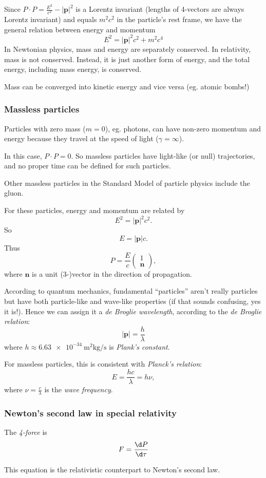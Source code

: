 \documentclass[a4paper]{article}
\begin{document}
Since $P\cdot P = \frac{E^2}{c^2} - |\mathbf{p}|^2$ is a Lorentz invariant (lengths of 4-vectors are always Lorentz invariant) and equals $m^2 c^2$ in the particle's rest frame, we have the general relation between energy and momentum
\[
  E^2 = |\mathbf{p}|^2 c^2 + m^2c^4
\]
In Newtonian physics, mass and energy are separately conserved. In relativity, mass is not conserved. Instead, it is just another form of energy, and the total energy, including mass energy, is conserved.

Mass can be converged into kinetic energy and vice versa (eg. atomic bombs!)

\subsubsection*{Massless particles}
Particles with zero mass ($m = 0$), eg. photons, can have non-zero momentum and energy because they travel at the speed of light ($\gamma = \infty$).

In this case, $P\cdot P = 0$. So massless particles have light-like (or null) trajectories, and no proper time can be defined for such particles.

Other massless particles in the Standard Model of particle physics include the gluon.

For these particles, energy and momentum are related by
\[
  E^2 = |\mathbf{p}|^2 c^2.
\]
So
\[
  E = |\mathbf{p}|c.
\]
Thus
\[
  P = \frac{E}{c}
  \begin{pmatrix}
    1\\
    \mathbf{n}
  \end{pmatrix},
\]
where $\mathbf{n}$ is a unit (3-)vector in the direction of propagation.

According to quantum mechanics, fundamental ``particles'' aren't really particles but have both particle-like and wave-like properties (if that sounds confusing, yes it is!). Hence we can assign it a \emph{de Broglie wavelength}, according to the \emph{de Broglie relation}:
\[
  |\mathbf{p}| = \frac{h}{\lambda}
\]
where $h \approx \SI{6.63e-34}{\meter\squared\kilogram\per\second}$ is \emph{Plank's constant}.

For massless particles, this is consistent with \emph{Planck's relation}:
\[
  E = \frac{hc}{\lambda} = h\nu,
\]
where $\nu = \frac{c}{\lambda}$ is the \emph{wave frequency}.
\subsubsection*{Newton's second law in special relativity}
\begin{defi}[4-force]
  The \emph{4-force} is
  \[
    F = \frac{\d P}{\d \tau}
  \]
\end{defi}
This equation is the relativistic counterpart to Newton's second law.
\end{document}
